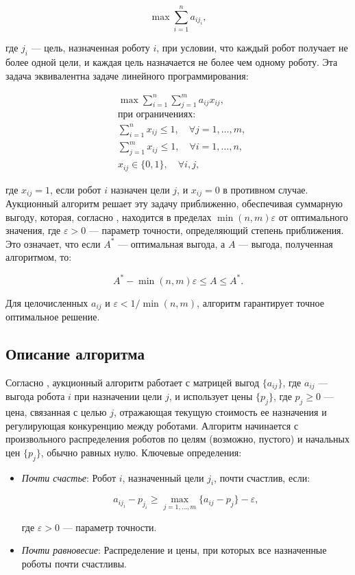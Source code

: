 \[
\max \sum_{i=1}^n a_{i j_i},
\]

\noindent где \( j_i \) --- цель, назначенная роботу \( i \), при условии, что каждый робот получает не более одной цели, и каждая цель назначается не более чем одному роботу. Эта задача эквивалентна задаче линейного программирования:

\[
\begin{aligned}
&\max \sum_{i=1}^n \sum_{j=1}^m a_{ij} x_{ij}, \\
&\text{при ограничениях:} \\
&\sum_{i=1}^n x_{ij} \leq 1, \quad \forall j = 1, \ldots, m, \\
&\sum_{j=1}^m x_{ij} \leq 1, \quad \forall i = 1, \ldots, n, \\
&x_{ij} \in \{0, 1\}, \quad \forall i, j,
\end{aligned}
\]

\noindent где \( x_{ij} = 1 \), если робот \( i \) назначен цели \( j \), и \( x_{ij} = 0 \) в противном случае. Аукционный алгоритм решает эту задачу приближенно, обеспечивая суммарную выгоду, которая, согласно \cite{bertsekas1990}, находится в пределах \( \min(n, m) \varepsilon \) от оптимального значения, где \( \varepsilon > 0 \) --- параметр точности, определяющий степень приближения. Это означает, что если \( A^* \) --- оптимальная выгода, а \( A \) --- выгода, полученная алгоритмом, то:

\[
A^* - \min(n, m) \varepsilon \leq A \leq A^*.
\]

Для целочисленных \( a_{ij} \) и \( \varepsilon < 1/\min(n, m) \), алгоритм гарантирует точное оптимальное решение.

\subsection{Описание алгоритма}
Согласно \cite{bertsekas1990}, аукционный алгоритм работает с матрицей выгод \( \{a_{ij}\} \), где \( a_{ij} \) — выгода робота \( i \) при назначении цели \( j \), и использует цены \( \{p_j\} \), где \( p_j \geq 0 \) — цена, связанная с целью \( j \), отражающая текущую стоимость ее назначения и регулирующая конкуренцию между роботами. Алгоритм начинается с произвольного распределения роботов по целям (возможно, пустого) и начальных цен \( \{p_j\} \), обычно равных нулю. Ключевые определения:

\begin{itemize}
    \item \textit{Почти счастье}: Робот \( i \), назначенный цели \( j_i \), почти счастлив, если:

    \[
    a_{i j_i} - p_{j_i} \geq \max_{j=1,\ldots,m} \{a_{ij} - p_j\} - \varepsilon,
    \]

    где \( \varepsilon > 0 \) — параметр точности.
    \item \textit{Почти равновесие}: Распределение и цены, при которых все назначенные роботы почти счастливы.
\end{itemize}

